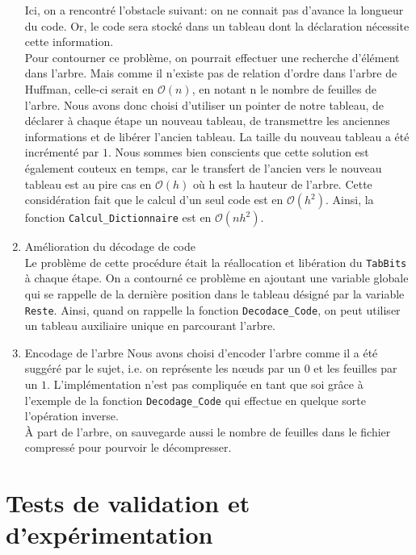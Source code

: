 \documentclass[a4paper,11pt]{article}
\begin{document}
\begin{enumerate}
			Ici, on a rencontré l'obstacle suivant: on ne connait pas d'avance la longueur du code. Or, le code sera stocké dans un tableau dont la déclaration nécessite cette information.\\
			Pour contourner ce problème, on pourrait effectuer une recherche d'élément dans l'arbre. Mais comme il n'existe pas de relation d'ordre dans l'arbre de Huffman, celle-ci serait en $\mathcal{O}(n)$, en notant n le nombre de feuilles de l'arbre.
			Nous avons donc choisi d'utiliser un pointer de notre tableau, de déclarer à chaque étape un nouveau tableau, de transmettre les anciennes informations et de libérer l'ancien tableau. La taille du nouveau tableau a été incrémenté par $1$. 
			Nous sommes bien conscients que cette solution est également couteux en temps, car le transfert de l'ancien vers le nouveau tableau est au pire cas en $\mathcal{O}(h)$ où h est la hauteur de l'arbre. Cette considération fait que le calcul d'un seul code est en $\mathcal{O}(h^2)$. 
			Ainsi, la fonction \verb+Calcul_Dictionnaire+ est en $\mathcal{O}(nh^2)$.
		\item{Amélioration du décodage de code}\\
			Le problème de cette procédure était la réallocation et libération du \verb+TabBits+ à chaque étape. On a contourné ce problème en ajoutant une variable globale qui se rappelle de la dernière position dans le tableau désigné par la variable \verb+Reste+. Ainsi, quand on rappelle la fonction \verb+Decodace_Code+, on peut utiliser un tableau auxiliaire unique en parcourant l'arbre.
		\item{Encodage de l'arbre}
			Nous avons choisi d'encoder l'arbre comme il a été suggéré par le sujet, i.e. on représente les n\oe{}uds par un $0$ et les feuilles par un $1$. L'implémentation n'est pas compliquée en tant que soi grâce à l'exemple de la fonction \verb+Decodage_Code+ qui effectue en quelque sorte l'opération inverse.\\
			À part de l'arbre, on sauvegarde aussi le nombre de feuilles dans le fichier compressé pour pourvoir le décompresser.
	\end{enumerate}

\section{Tests de validation et d'expérimentation} 
\end{document}
